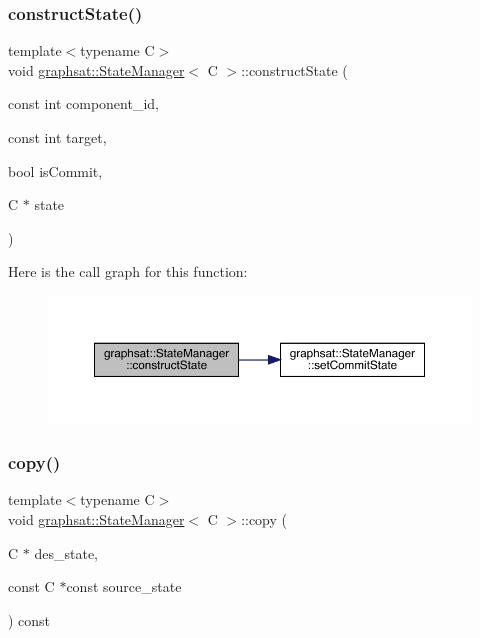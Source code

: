 \subsubsection{\texorpdfstring{constructState()}{constructState()}\hspace{0.1cm}{\footnotesize\ttfamily [2/2]}}
{\footnotesize\ttfamily template$<$typename C$>$ \\
void \mbox{\hyperlink{classgraphsat_1_1_state_manager}{graphsat\+::\+State\+Manager}}$<$ C $>$\+::construct\+State (\begin{DoxyParamCaption}\item[{const int}]{component\+\_\+id,  }\item[{const int}]{target,  }\item[{bool}]{is\+Commit,  }\item[{C $\ast$}]{state }\end{DoxyParamCaption})\hspace{0.3cm}{\ttfamily [inline]}}

Here is the call graph for this function\+:
\nopagebreak
\begin{figure}[H]
\begin{center}
\leavevmode
\includegraphics[width=350pt]{classgraphsat_1_1_state_manager_ad760d94bfbd8b7403b88a850f785f297_cgraph}
\end{center}
\end{figure}
\mbox{\label{classgraphsat_1_1_state_manager_a72f101a0a08cddc5553e75ea54281cbe}} 
\subsubsection{\texorpdfstring{copy()}{copy()}}
{\footnotesize\ttfamily template$<$typename C$>$ \\
void \mbox{\hyperlink{classgraphsat_1_1_state_manager}{graphsat\+::\+State\+Manager}}$<$ C $>$\+::copy (\begin{DoxyParamCaption}\item[{C $\ast$}]{des\+\_\+state,  }\item[{const C $\ast$const}]{source\+\_\+state }\end{DoxyParamCaption}) const\hspace{0.3cm}{\ttfamily [inline]}}

